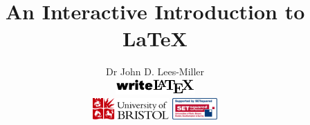 \newenvironment{exampletwouptiny}
  {\VerbatimEnvironment
   \begin{VerbatimOut}{example.out}}
  {\end{VerbatimOut}
   \setlength{\parindent}{0pt}
   \fbox{\begin{tabular}{l|l}
   \begin{minipage}{0.55\linewidth}
     \inputminted[fontsize=\scriptsize,resetmargins]{latex}{example.out}
   \end{minipage} &
   \begin{minipage}{0.35\linewidth}
     \setlength{\parskip}{6pt plus 1pt minus 1pt}%
     \raggedright\scriptsize
   \end{minipage}
   \end{tabular}}}

\title{An Interactive Introduction to \LaTeX}
\author{Dr John D. Lees-Miller\\[1em]
\includegraphics[page=4]{wllogo-series}\\[1em]
\includegraphics[height=24pt]{UoB-logo}
\qquad
\includegraphics[height=24pt]{setsquared_supported}
}

